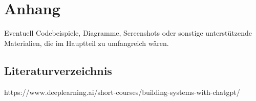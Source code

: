 \chapter{Anhang}
Eventuell Codebeispiele, Diagramme, Screenshots oder sonstige unterstützende Materialien, die im Hauptteil zu umfangreich wären.

\section{Literaturverzeichnis}

https://www.deeplearning.ai/short-courses/building-systems-with-chatgpt/